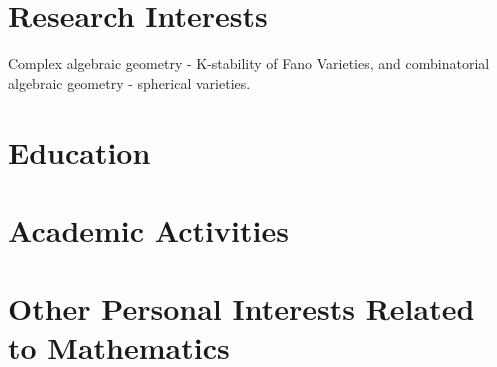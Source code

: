 \documentclass[a4paper, 11pt]{article}
\begin{document}


\section{Research Interests}
Complex algebraic geometry - K-stability of Fano Varieties, and combinatorial algebraic geometry - spherical varieties.


\section{Education}


% 

\section{Academic Activities}


\section{Other Personal Interests Related to Mathematics}


% 
\end{document}
